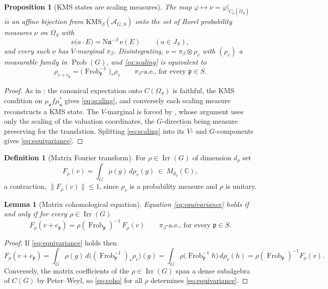 \documentclass[11pt]{amsart}
\numberwithin{equation}{section}
\newtheorem{proposition}[theorem]{Proposition}
\newtheorem{lemma}[theorem]{Lemma}
\theoremstyle{definition}
\newtheorem{definition}[theorem]{Definition}
\theoremstyle{remark}
\newcommand{\C}{\mathbb{C}}
\newcommand{\cA}{\mathcal{A}}
\newcommand{\pp}{\mathfrak{p}}
\newcommand{\aaa}{\mathfrak{a}}
\newcommand{\Ns}{\mathrm{N}}
\newcommand{\Frob}{\operatorname{Frob}}
\newcommand{\Irr}{\operatorname{Irr}}
\newcommand{\Prob}{\operatorname{Prob}}
\begin{document}
\begin{proposition}[KMS states are scaling measures]\label{prop:kmsmeasure}
The map $\varphi\mapsto\nu=\varphi|_{C_0(\widetilde\Omega_S)}$ is an affine bijection from
$\mathrm{KMS}_\beta(\cA_{G,S})$ onto the set of Borel probability measures $\nu$ on
$\Omega_S$ with
\begin{equation}\label{eq:scaling}
\nu\bigl(a\cdot E\bigr)=\Ns\aaa^{-\beta}\,\nu(E)\qquad(a\in J_S),
\end{equation}
and every such $\nu$ has $V$-marginal $\pi_\beta$. Disintegrating, $\nu=\pi_\beta\otimes\rho_v$
with $(\rho_v)$ a measurable family in $\Prob(G)$, and \eqref{eq:scaling} is equivalent to
\begin{equation}\label{eq:equivariance}
\rho_{v+e_\pp}=\bigl(\Frob_\pp^{-1}\bigr)_*\rho_v\qquad\pi_\beta\text{-a.e., for every }\pp\in S.
\end{equation}
\end{proposition}

\begin{proof}
As in \cite[Prop.~2.8]{Main}: the canonical expectation onto $C(\Omega_S)$ is
faithful, the KMS condition on $\mu_\aaa f\mu_\aaa^*$ gives \eqref{eq:scaling}, and
conversely each scaling measure reconstructs a KMS state. The $V$-marginal is forced by
\cite[Lem.~2.10]{Main}, whose argument uses only the scaling of the valuation coordinates,
the $G$-direction being measure preserving for the translation.
Splitting \eqref{eq:scaling} into its $V$- and $G$-components gives \eqref{eq:equivariance}.
\end{proof}

\begin{definition}[Matrix Fourier transform]\label{def:F}
For $\rho\in\Irr(G)$ of dimension $d_\rho$ set
\[
F_\rho(v)=\int_G\rho(g)\,d\rho_v(g)\ \in\ M_{d_\rho}(\C),
\]
a contraction, $\|F_\rho(v)\|\le1$, since $\rho_v$ is a probability measure and $\rho$ is
unitary.
\end{definition}

\begin{lemma}[Matrix cohomological equation]\label{lem:coho}
Equation \eqref{eq:equivariance} holds if and only if for every $\rho\in\Irr(G)$
\begin{equation}\label{eq:coho}
F_\rho(v+e_\pp)=\rho(\Frob_\pp)^{-1}\,F_\rho(v)\qquad\pi_\beta\text{-a.e., for every }\pp\in S .
\end{equation}
\end{lemma}

\begin{proof}
If \eqref{eq:equivariance} holds then
\[
F_\rho(v+e_\pp)=\int_G\rho(g)\,d\bigl((\Frob_\pp^{-1})_*\rho_v\bigr)(g)
=\int_G\rho\bigl(\Frob_\pp^{-1}h\bigr)\,d\rho_v(h)
=\rho(\Frob_\pp)^{-1}F_\rho(v).
\]
Conversely, the matrix coefficients of the $\rho\in\Irr(G)$ span a dense subalgebra of $C(G)$
by Peter--Weyl, so \eqref{eq:coho} for all $\rho$ determines \eqref{eq:equivariance}.
\end{proof}
\end{document}
